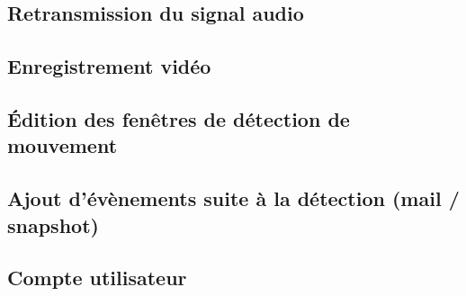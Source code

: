 \subsection{Retransmission du signal audio}
\subsection{Enregistrement vidéo}
\subsection{Édition des fenêtres de détection  de mouvement}
\subsection{Ajout d'évènements suite à la détection (mail / snapshot)}
\subsection{Compte utilisateur}
\clearpage
